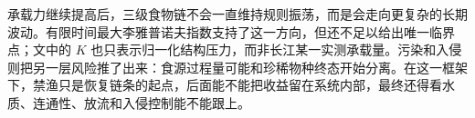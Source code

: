承载力继续提高后，三级食物链不会一直维持规则振荡，而是会走向更复杂的长期波动。有限时间最大李雅普诺夫指数支持了这一方向，但还不足以给出唯一临界点；文中的 $K$ 也只表示归一化结构压力，而非长江某一实测承载量。污染和入侵则把另一层风险推了出来：食源过程量可能和珍稀物种终态开始分离。在这一框架下，禁渔只是恢复链条的起点，后面能不能把收益留在系统内部，最终还得看水质、连通性、放流和入侵控制能不能跟上。
